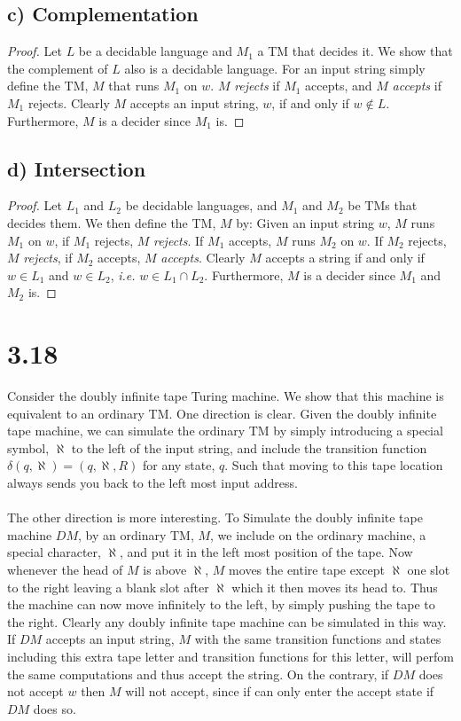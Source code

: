 \documentclass[a4paper,11pt]{article}
\newcommand{\ie}{\emph{i.e.} }
\numberwithin{equation}{section}
\begin{document}
	\subsection*{c) Complementation}
	\begin{proof}
		Let $L$ be a decidable language and $M_1$ a TM that decides it. We show that the complement of $L$ also is a decidable language. For an input string simply define the TM, $ M $ that runs $M_1$ on $w$. $M$ \emph{rejects} if $ M_1 $ accepts, and $M$ \emph{accepts} if $M_1$ rejects. Clearly $ M $ accepts an input string, $ w $, if and only if $ w\notin L $. Furthermore, $ M $ is a decider since $ M_1 $ is.
	\end{proof}
	\subsection*{d) Intersection}
	\begin{proof}
		Let $ L_1 $ and $ L_2 $ be decidable languages, and $ M_1 $ and $ M_2 $ be TMs that decides them. We then define the TM, $ M $ by: 
		Given an input string $w$, $ M $ runs $ M_1 $ on $ w $, if $ M_1 $ rejects, $ M $ \emph{rejects}. If $M_1$ accepts, $ M $ runs $ M_2 $ on $ w $. If $ M_2 $ rejects, $ M $ \emph{rejects}, if $ M_2 $ accepts, $ M $ \emph{accepts}. Clearly $ M $ accepts a string if and only if $ w\in L_1 $ and $ w\in L_2 $, \ie $ w\in L_1\cap L_2 $. Furthermore, $ M $ is a decider since $ M_1 $ and $ M_2 $ is.
	\end{proof}
	\section*{3.18}
	Consider the doubly infinite tape Turing machine. We show that this machine is equivalent to an ordinary TM. One direction is clear. Given the doubly infinite tape machine, we can simulate the ordinary TM by simply introducing a special symbol, $ \aleph $ to the left of the input string, and include the transition function $ \delta(q,\aleph)=(q,\aleph,R) $ for any state, $ q $. Such that moving to this tape location always sends you back to the left most input address.\\
	\\
	The other direction is more interesting. To Simulate the doubly infinite tape machine $ DM $, by an ordinary TM, $ M $, we include on the ordinary machine, a special character, $ \aleph $, and put it in the left most position of the tape. Now whenever the head of $ M $ is above $ \aleph $, $ M $ moves the entire tape except $ \aleph $ one slot to the right leaving a blank slot after $ \aleph $ which it then moves its head to. Thus the machine can now move infinitely to the left, by simply pushing the tape to the right. Clearly any doubly infinite tape machine can be simulated in this way. If $ DM $ accepts an input string, $ M $ with the same transition functions and states including this extra tape letter and transition functions for this letter, will perfom the same computations and thus accept the string. On the contrary, if $ DM $ does not accept $ w $ then $ M $ will not accept, since if can only enter the accept state if $ DM $ does so.
	
\end{document}
